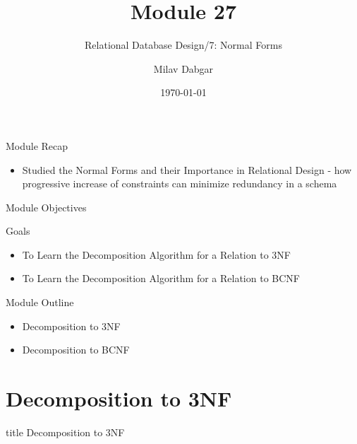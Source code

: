 \documentclass[aspectratio=169, xcolor=dvipsnames]{beamer}
\title{Module 27}
\subtitle{Relational Database Design/7: Normal Forms}
\author{Milav Dabgar}
\institute{www.milav.in}
\date{\today}
\begin{document}
\begin{frame}
    \titlepage
\end{frame}

\begin{frame}{Module Recap}
    \begin{itemize}[<+->]
        \item Studied the Normal Forms and their Importance in Relational Design - how progressive increase of constraints can minimize redundancy in a schema
    \end{itemize}
\end{frame}

\begin{frame}{Module Objectives}
    \begin{block}{Goals}
        \begin{itemize}[<+->]
            \item To Learn the Decomposition Algorithm for a Relation to 3NF
            \item To Learn the Decomposition Algorithm for a Relation to BCNF
        \end{itemize}
    \end{block}
\end{frame}

\begin{frame}{Module Outline}
    \begin{itemize}[<+->]
        \item Decomposition to 3NF
        \item Decomposition to BCNF
    \end{itemize}
\end{frame}

\section{Decomposition to 3NF}
\begin{frame}
  \vfill
  \centering
  \begin{beamercolorbox}[sep=8pt,center,shadow=true,rounded=true]{title}
    Decomposition to 3NF\par%
  \end{beamercolorbox}
  \vfill
\end{frame}
\end{document}
